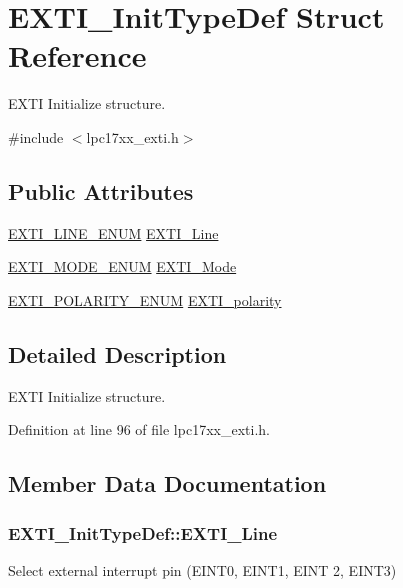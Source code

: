 \hypertarget{struct_e_x_t_i___init_type_def}{\section{\-E\-X\-T\-I\-\_\-\-Init\-Type\-Def \-Struct \-Reference}
\label{struct_e_x_t_i___init_type_def}
}


\-E\-X\-T\-I \-Initialize structure.  




{\ttfamily \#include $<$lpc17xx\-\_\-exti.\-h$>$}

\subsection*{\-Public \-Attributes}
\begin{DoxyCompactItemize}
\item 
\hyperlink{group___e_x_t_i___public___types_ga801d7b6336865f9903b69623a89c1a69}{\-E\-X\-T\-I\-\_\-\-L\-I\-N\-E\-\_\-\-E\-N\-U\-M} \hyperlink{struct_e_x_t_i___init_type_def_a4094590c9215c0110b005e97d686e23d}{\-E\-X\-T\-I\-\_\-\-Line}
\item 
\hyperlink{group___e_x_t_i___public___types_ga97c789b0a35f1410c0a501ea23c54216}{\-E\-X\-T\-I\-\_\-\-M\-O\-D\-E\-\_\-\-E\-N\-U\-M} \hyperlink{struct_e_x_t_i___init_type_def_a8e24dfd6a85efbfd421814e76c33a4ad}{\-E\-X\-T\-I\-\_\-\-Mode}
\item 
\hyperlink{group___e_x_t_i___public___types_ga1b5e79307a79d0b2bc548041d4dd7dcd}{\-E\-X\-T\-I\-\_\-\-P\-O\-L\-A\-R\-I\-T\-Y\-\_\-\-E\-N\-U\-M} \hyperlink{struct_e_x_t_i___init_type_def_a2e61c10ab5ab19467405d62beb2e917a}{\-E\-X\-T\-I\-\_\-polarity}
\end{DoxyCompactItemize}


\subsection{\-Detailed \-Description}
\-E\-X\-T\-I \-Initialize structure. 

\-Definition at line 96 of file lpc17xx\-\_\-exti.\-h.



\subsection{\-Member \-Data \-Documentation}
\hypertarget{struct_e_x_t_i___init_type_def_a4094590c9215c0110b005e97d686e23d}{
\subsubsection[{\-E\-X\-T\-I\-\_\-\-Line}]{ {\bf \-E\-X\-T\-I\-\_\-\-Init\-Type\-Def\-::\-E\-X\-T\-I\-\_\-\-Line}}}\label{struct_e_x_t_i___init_type_def_a4094590c9215c0110b005e97d686e23d}
\-Select external interrupt pin (\-E\-I\-N\-T0, \-E\-I\-N\-T1, \-E\-I\-N\-T 2, \-E\-I\-N\-T3) 

